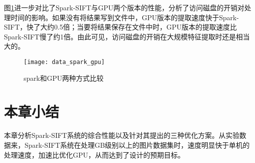 图\ref{fig:data_spark_gpu}进一步对比了Spark-SIFT与GPU两个版本的性能，分析了访问磁盘的开销对处理时间的影响。如果没有将结果写到文件中，GPU版本的提取速度快于Spark-SIFT，快了大约0.5倍；当要将结果保存在文件中时，GPU版本的提取速度比Spark-SIFT慢了约1倍。由此可见，访问磁盘的开销在大规模特征提取时还是相当大的。
\begin{figure}[htp]
\centering
\texttt{[image: data\_spark\_gpu]}
\caption{spark和GPU两种方式比较}
\label{fig:data_spark_gpu}
\end{figure}
\section{本章小结}
本章分析Spark-SIFT系统的综合性能以及针对其提出的三种优化方案。从实验数据来，Spark-SIFT系统在处理GB级别以上的图片数据集时，速度明显快于单机的处理速度，加速比优化GPU，从而达到了设计的预期目标。

